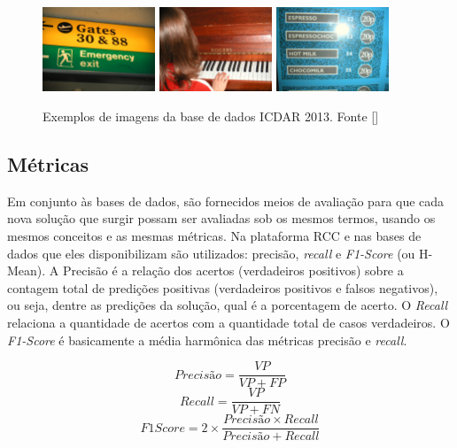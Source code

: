 \begin{figure}
    \centering
    \includegraphics[width=0.3\textwidth]{figs/img_20.jpg}
    \includegraphics[width=0.3\textwidth]{figs/img_85.jpg}
    \includegraphics[width=0.3\textwidth]{figs/img_225.jpg}
    \caption{Exemplos de imagens da base de dados ICDAR 2013. Fonte []}
    \label{fig:icdar2013_examples}
\end{figure}

\subsection{Métricas}\label{sec:methodology_metrics}
Em conjunto às bases de dados, são fornecidos meios de avaliação para que cada nova solução que surgir possam ser avaliadas sob os mesmos termos, 
usando os mesmos conceitos e as mesmas métricas. Na plataforma RCC e nas bases de dados que eles disponibilizam são utilizados: precisão, 
\textit{recall} e \textit{F1-Score} (ou H-Mean). A Precisão é a relação dos acertos (verdadeiros positivos) sobre a contagem total de predições 
positivas (verdadeiros positivos e falsos negativos), ou seja, dentre as predições da solução, qual é a porcentagem de acerto. O \textit{Recall} 
relaciona a quantidade de acertos com a quantidade total de casos verdadeiros. O \textit{F1-Score} é basicamente a média harmônica das métricas 
precisão e \textit{recall}.

\begin{equation}
    Precisão = \frac{VP}{VP + FP}
\end{equation}
\begin{equation}
    Recall = \frac{VP}{VP + FN}
\end{equation}
\begin{equation}
    F1Score = 2 \times \frac{Precisão \times Recall}{Precisão + Recall}
\end{equation}

